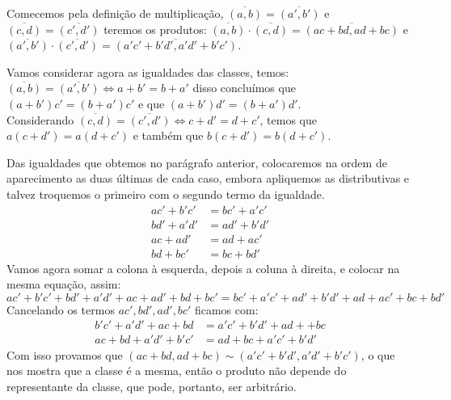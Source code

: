 \documentclass[../main.tex]{subfiles}
\begin{document}
\begin{dem}
    Comecemos pela definição de multiplicação, $\overline{(a,b)} = \overline{(a',b')}$ e $\overline{(c,d)} = \overline{(c',d')}$ teremos os produtos:
    $\overline{(a,b)} \cdot \overline{(c,d)} = \overline{(ac+bd,ad+bc)}$ e $\overline{(a',b')} \cdot \overline{(c',d')} = \overline{(a'c'+b'd',a'd'+b'c')}$.
    
    Vamos considerar agora as igualdades das classes, temos: \\
        $\overline{(a,b)} = \overline{(a',b')} \iff a + b' = b + a' $ disso concluímos que 
        $ (a + b')c' = (b + a')c'$ e que $(a + b')d' = (b + a')d'$. \\
    Considerando $\overline{(c,d)} = \overline{(c',d')} \iff c + d' = d + c' $, temos que
    $a(c + d') = a(d + c')$ e também que $b(c + d') = b(d + c')$.
    
    Das igualdades que obtemos no parágrafo anterior, colocaremos na ordem de aparecimento as duas últimas de cada caso, embora apliquemos as distributivas e talvez troquemos o primeiro com o segundo termo da igualdade.
    \begin{align*}
        ac'+b'c' &= bc'+a'c' \\
        bd'+a'd' &= ad'+b'd' \\
        ac+ad'   &= ad+ac' \\
        bd+bc'   &= bc+bd'   
    \end{align*}
    Vamos agora somar a colona à esquerda, depois a coluna à direita, e colocar na mesma equação, assim:
    $$ac'+b'c' + bd'+a'd' + ac+ad' + bd+bc' = bc'+a'c' + ad'+b'd' + ad+ac' + bc+bd'$$
    Cancelando os termos $ac', bd', ad', bc'$ ficamos com:
    \begin{align*}
        b'c' +a'd' + ac + bd  &= a'c' + b'd' + ad+ + bc \\
        ac + bd + a'd' + b'c' &= ad + bc + a'c' + b'd'
    \end{align*}
    Com isso provamos que $ (ac+bd,ad+bc) \sim (a'c'+b'd',a'd'+b'c')$, o que nos mostra que a classe é a mesma, então o produto não depende do representante da classe, que pode, portanto, ser arbitrário.
\end{dem}
\end{document}
